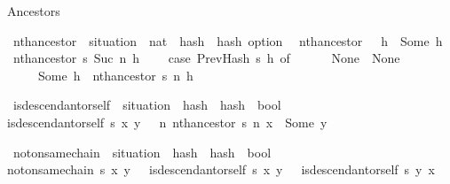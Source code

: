 \documentclass{beamer}
\begin{document}
\begin{frame}{Ancestors}

\isamarkupfalse%
\ nth{\isacharunderscore}ancestor\ {\isacharcolon}{\isacharcolon}\ {\isachardoublequoteopen}situation\ {\isasymRightarrow}\ nat\ {\isasymRightarrow}\ hash\ {\isasymRightarrow}\ hash\ option{\isachardoublequoteclose}\isanewline
{}\isanewline
\ \ {\isachardoublequoteopen}nth{\isacharunderscore}ancestor\ {\isacharunderscore}\ {}\ h\ {\isacharequal}\ Some\ h{\isachardoublequoteclose}\isanewline
{\isacharbar}\ {\isachardoublequoteopen}nth{\isacharunderscore}ancestor\ s\ {\isacharparenleft}Suc\ n{\isacharparenright}\ h\ {\isacharequal}\isanewline
\ \ \ {\isacharparenleft}case\ PrevHash\ s\ h\ of\isanewline
\ \ \ \ \ \ None\ {\isasymRightarrow}\ None\isanewline
\ \ \ \ {\isacharbar}\ Some\ h{\isacharprime}\ {\isasymRightarrow}\ nth{\isacharunderscore}ancestor\ s\ n\ h{\isacharprime}{\isacharparenright}{\isachardoublequoteclose}%

\end{frame}

\begin{frame}
\isamarkupfalse%
\ is{\isacharunderscore}descendant{\isacharunderscore}or{\isacharunderscore}self\ {\isacharcolon}{\isacharcolon}\ {\isachardoublequoteopen}situation\ {\isasymRightarrow}\ hash\ {\isasymRightarrow}\ hash\ {\isasymRightarrow}\ bool{\isachardoublequoteclose}\isanewline
{}\isanewline
           {\isachardoublequoteopen}is{\isacharunderscore}descendant{\isacharunderscore}or{\isacharunderscore}self\ s\ x\ y\ {\isacharequal}\ {\isacharparenleft}{\isasymexists}\ n{\isachardot}\ nth{\isacharunderscore}ancestor\ s\ n\ x\ {\isacharequal}\ Some\ y{\isacharparenright}{\isachardoublequoteclose}%

           \vfill
{}\isamarkupfalse%
\ not{\isacharunderscore}on{\isacharunderscore}same{\isacharunderscore}chain\ {\isacharcolon}{\isacharcolon}\ {\isachardoublequoteopen}situation\ {\isasymRightarrow}\ hash\ {\isasymRightarrow}\ hash\ {\isasymRightarrow}\ bool{\isachardoublequoteclose}\isanewline
{}\isanewline
{\isachardoublequoteopen}not{\isacharunderscore}on{\isacharunderscore}same{\isacharunderscore}chain\ s\ x\ y\ {\isacharequal}\ {\isacharparenleft}{\isacharparenleft}{\isasymnot}\ is{\isacharunderscore}descendant{\isacharunderscore}or{\isacharunderscore}self\ s\ x\ y{\isacharparenright}\ {\isasymand}\ {\isacharparenleft}{\isasymnot}\ is{\isacharunderscore}descendant{\isacharunderscore}or{\isacharunderscore}self\ s\ y\ x{\isacharparenright}{\isacharparenright}{\isachardoublequoteclose}%
\end{frame}
\end{document}
